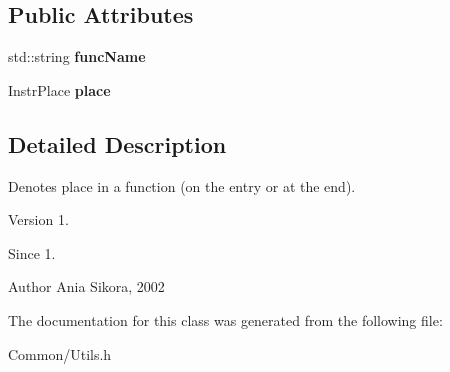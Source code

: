 \subsection*{Public Attributes}
\begin{DoxyCompactItemize}
\item 
\hypertarget{class_common_1_1_breakpoint_a46aa1e243f9e75177c55ff2b2cdb4bb5}{std\-::string {\bfseries func\-Name}}\label{class_common_1_1_breakpoint_a46aa1e243f9e75177c55ff2b2cdb4bb5}

\item 
\hypertarget{class_common_1_1_breakpoint_ae0a7e51094dc889befb90b99e3bff8f9}{Instr\-Place {\bfseries place}}\label{class_common_1_1_breakpoint_ae0a7e51094dc889befb90b99e3bff8f9}

\end{DoxyCompactItemize}


\subsection{Detailed Description}
Denotes place in a function (on the entry or at the end). 

\begin{DoxyVersion}{Version}
1. 
\end{DoxyVersion}
\begin{DoxySince}{Since}
1. 
\end{DoxySince}
\begin{DoxyAuthor}{Author}
Ania Sikora, 2002 
\end{DoxyAuthor}


The documentation for this class was generated from the following file\-:\begin{DoxyCompactItemize}
\item 
Common/Utils.\-h\end{DoxyCompactItemize}
